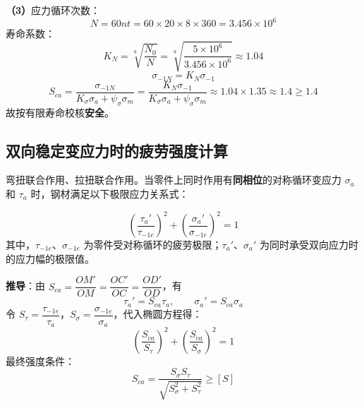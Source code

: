 \begin{longexample}[单向稳定变应力疲劳强度校核]
\begin{solution}
\textbf{（3）}应力循环次数：
\begin{equation}
	N=60nt=60\times20\times8\times360=3.456\times10^6
	\label{eq:强度:例1循环次数}
\end{equation}
寿命系数：
\begin{equation}
	K_N=\sqrt[9]{\frac{N_0}{N}}=\sqrt[9]{\frac{5\times10^6}{3.456\times10^6}}\approx1.04
	\label{eq:强度:例1寿命系数}
\end{equation}
\begin{equation}
	\sigma_{-1N}=K_N\sigma_{-1}
	\label{eq:强度:例1疲劳极限}
\end{equation}
\begin{equation}
	S_{ca}=\frac{\sigma_{-1N}}{K_\sigma\sigma_a+\psi_\sigma\sigma_m}=\frac{K_N\sigma_{-1}}{K_\sigma\sigma_a+\psi_\sigma\sigma_m}\approx1.04\times1.35\approx1.4\ge1.4
	\label{eq:强度:例1有限寿命}
\end{equation}
故按有限寿命校核\textbf{安全}。
\end{solution}
\end{longexample}

\subsection{双向稳定变应力时的疲劳强度计算}

弯扭联合作用、拉扭联合作用。当零件上同时作用有\textbf{同相位}的对称循环变应力 $\sigma_a$ 和 $\tau_a$ 时，钢材满足以下极限应力关系式：

\begin{theorem}[双向稳定变应力的强度条件]
\label{thm:双向}
\begin{equation}
	\left(\frac{\tau_a'}{\tau_{-1e}}\right)^2+\left(\frac{\sigma_a'}{\sigma_{-1e}}\right)^2=1
	\label{eq:强度:椭圆方程}
\end{equation}
其中，$\tau_{-1e}$、$\sigma_{-1e}$ 为零件受对称循环的疲劳极限；$\tau_a'$、$\sigma_a'$ 为同时承受双向应力时的应力幅的极限值。

\textbf{推导}：由 $S_{ca}=\dfrac{OM'}{OM}=\dfrac{OC'}{OC}=\dfrac{OD'}{OD}$，有
\begin{equation}
	\tau_a'=S_{ca}\tau_a,\qquad \sigma_a'=S_{ca}\sigma_a
	\label{eq:强度:双向应力幅}
\end{equation}
令 $S_\tau=\dfrac{\tau_{-1e}}{\tau_a}$，$S_\sigma=\dfrac{\sigma_{-1e}}{\sigma_a}$，代入椭圆方程得：
\begin{equation}
	\left(\frac{S_{ca}}{S_\tau}\right)^2+\left(\frac{S_{ca}}{S_\sigma}\right)^2=1
	\label{eq:强度:双向椭圆方程}
\end{equation}
最终强度条件：
\begin{equation}
	S_{ca}=\frac{S_\sigma S_\tau}{\sqrt{S_\sigma^2+S_\tau^2}}\ge[S]
	\label{eq:强度:双向安全系数}
\end{equation}
\end{theorem}

